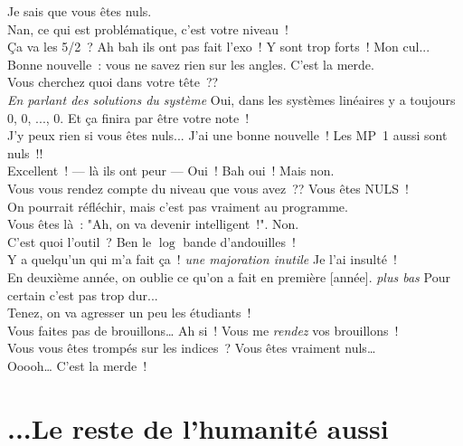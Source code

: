 \documentclass[french, a4paper, openany]{book}
\begin{document}
		\og Je sais que vous êtes nuls. \fg \\
		\og Nan, ce qui est problématique, c'est votre niveau~! \fg \\
		\og Ça va les 5/2~? Ah bah ils ont pas fait l'exo~! Y sont trop forts~! Mon cul... \fg \\
		\og Bonne nouvelle~: vous ne savez rien sur les angles. C'est la merde. \fg \\
		\og Vous cherchez quoi dans votre tête~?? \fg \\
		\emph{En parlant des solutions du système} \og Oui, dans les systèmes linéaires y a toujours 0, 0, ..., 0. Et ça finira par être votre note~! \fg \\
		\og J'y peux rien si vous êtes nuls... J'ai une bonne nouvelle~! Les MP~1 aussi sont nuls~!! \fg \\
		\og Excellent~! — là ils ont peur — Oui~! Bah oui~! Mais non. \fg \\
		\og Vous vous rendez compte du niveau que vous avez~?? Vous êtes NULS~! \fg \\
		\og On pourrait réfléchir, mais c'est pas vraiment au programme. \fg \\
		\og Vous êtes là~: "Ah, on va devenir intelligent~!". Non. \fg \\
		\og C'est quoi l'outil~? Ben le $\log$ bande d'andouilles~! \fg \\
		\og Y a quelqu'un qui m'a fait ça~! \emph{une majoration inutile} Je l'ai insulté~! \fg \\
		\og En deuxième année, on oublie ce qu'on a fait en première [année]. \emph{plus bas} Pour certain c'est pas trop dur... \fg \\
		\og Tenez, on va agresser un peu les étudiants~! \fg \\
		\og Vous faites pas de brouillons… Ah si~! Vous me \emph{rendez} vos brouillons~! \fg \\
		\og Vous vous êtes trompés sur les indices~? Vous êtes vraiment nuls… \fg \\
		\og Ooooh… C'est la merde~! \fg \\
	
\section*{...Le reste de l'humanité aussi}
\end{document}
